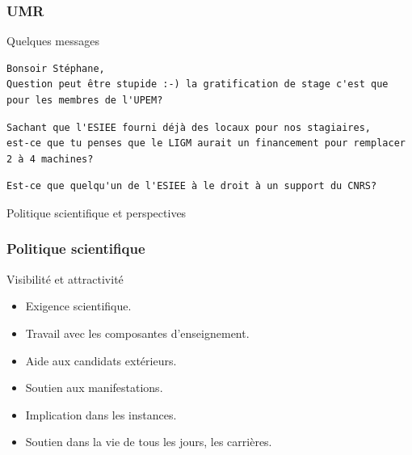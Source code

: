\documentclass[]{beamer}
\begin{document}

\begin{frame}[fragile]
  \frametitle{UMR}

  \begin{block}{Quelques messages}
    {\footnotesize
      \begin{verbatim}
Bonsoir Stéphane,
Question peut être stupide :-) la gratification de stage c'est que
pour les membres de l'UPEM?
      \end{verbatim}
    }%

    {\footnotesize
      \begin{verbatim}
Sachant que l'ESIEE fourni déjà des locaux pour nos stagiaires,
est-ce que tu penses que le LIGM aurait un financement pour remplacer
2 à 4 machines?
      \end{verbatim}
    }%

    {\footnotesize
      \begin{verbatim}
Est-ce que quelqu'un de l'ESIEE à le droit à un support du CNRS?
      \end{verbatim}
    }%
  \end{block}

\end{frame}


\begin{frame}[label=introduction, standout]{}
  Politique scientifique et perspectives
\end{frame}


\begin{frame}
  \frametitle{Politique scientifique}

  \begin{block}{Visibilité et attractivité}
    \begin{itemize} \setlength\itemsep{0em}
      \item Exigence scientifique.
      \item Travail avec les composantes d'enseignement.
      \item Aide aux candidats extérieurs.
      \item Soutien aux manifestations.
      \item Implication dans les instances.
      \item Soutien dans la vie de tous les jours, les carrières.
    \end{itemize}
  \end{block}

\end{frame}
\end{document}
